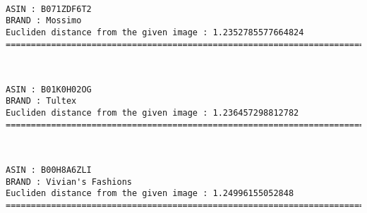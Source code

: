 \documentclass[11pt]{article}
\begin{document}
    \begin{center}
    \end{center}
    { \hspace*{\fill} \\}
    
    \begin{Verbatim}[commandchars=\\\{\}]
ASIN : B071ZDF6T2
BRAND : Mossimo
Eucliden distance from the given image : 1.2352785577664824
=============================================================================================================================

    \end{Verbatim}

    \begin{center}
    \end{center}
    { \hspace*{\fill} \\}
    
    \begin{Verbatim}[commandchars=\\\{\}]
ASIN : B01K0H02OG
BRAND : Tultex
Eucliden distance from the given image : 1.236457298812782
=============================================================================================================================

    \end{Verbatim}

    \begin{center}
    \end{center}
    { \hspace*{\fill} \\}
    
    \begin{Verbatim}[commandchars=\\\{\}]
ASIN : B00H8A6ZLI
BRAND : Vivian's Fashions
Eucliden distance from the given image : 1.24996155052848
=============================================================================================================================

    \end{Verbatim}

    \begin{center}
    \end{center}
    { \hspace*{\fill} \\}
    
\end{document}
